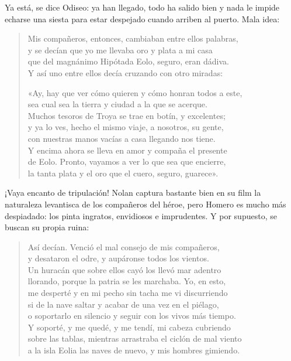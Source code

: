 Ya está, se dice Odiseo: ya han llegado, todo ha salido bien y nada le impide echarse una siesta para estar despejado cuando arriben al puerto. Mala idea:

\begin{verse}
Mis compañeros, entonces, cambiaban entre ellos palabras,\\
y se decían que yo me llevaba oro y plata a mi casa\\
que del magnánimo Hipótada Eolo, seguro, eran dádiva.\\
Y así uno entre ellos decía cruzando con otro miradas:

«Ay, hay que ver cómo quieren y cómo honran todos a este,\\
sea cual sea la tierra y ciudad a la que se acerque.\\
Muchos tesoros de Troya se trae en botín, y excelentes;\\
y ya lo ves, hecho el mismo viaje, a nosotros, su gente,\\
con nuestras manos vacías a casa llegando nos tiene.\\
Y encima ahora se lleva en amor y compaña el presente\\
de Eolo. Pronto, vayamos a ver lo que sea que encierre,\\
la tanta plata y el oro que el cuero, seguro, guarece».
\end{verse}

¡Vaya encanto de tripulación! Nolan captura bastante bien en su film la naturaleza levantisca de los compañeros del héroe, pero Homero es mucho más despiadado: los pinta ingratos, envidiosos e imprudentes. Y por supuesto, se buscan su propia ruina:

\begin{verse}
Así decían. Venció el mal consejo de mis compañeros,\\
y desataron el odre, y aupáronse todos los vientos.\\
Un huracán que sobre ellos cayó los llevó mar adentro\\
llorando, porque la patria se les marchaba. Yo, en esto,\\
me desperté y en mi pecho sin tacha me vi discurriendo\\
si de la nave saltar y acabar de una vez en el piélago,\\
o soportarlo en silencio y seguir con los vivos más tiempo.\\
Y soporté, y me quedé, y me tendí, mi cabeza cubriendo\\
sobre las tablas, mientras arrastraba el ciclón de mal viento\\
a la isla Eolia las naves de nuevo, y mis hombres gimiendo.
\end{verse}

